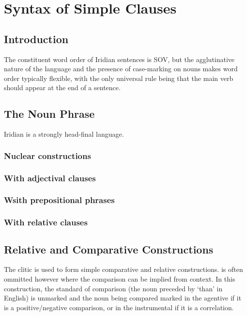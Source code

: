 \chapter{Syntax of Simple Clauses}

\section{Introduction}

The constituent word order of Iridian sentences is SOV, but the agglutinative nature of the language and the presence of case-marking on nouns makes word order typically flexible, with the only universal rule being that the main verb should appear at the end of a sentence.

\section{The Noun Phrase}

Iridian is a strongly head-final language.

\subsection{Nuclear constructions}
\subsection{With adjectival clauses}
\subsection{Wsith prepositional phrases}
\subsection{With relative clauses}

\section{Relative and Comparative Constructions}\label{relativecomparative}

The clitic  is used to form simple comparative and relative constructions.  is often ommitted however where the comparison can be implied from context. In this construction, the standard of comparison (the noun preceded by `than' in English) is unmarked and the noun being compared marked in the agentive if it is a positive/negative comparison, or in the instrumental if it is a correlation.


